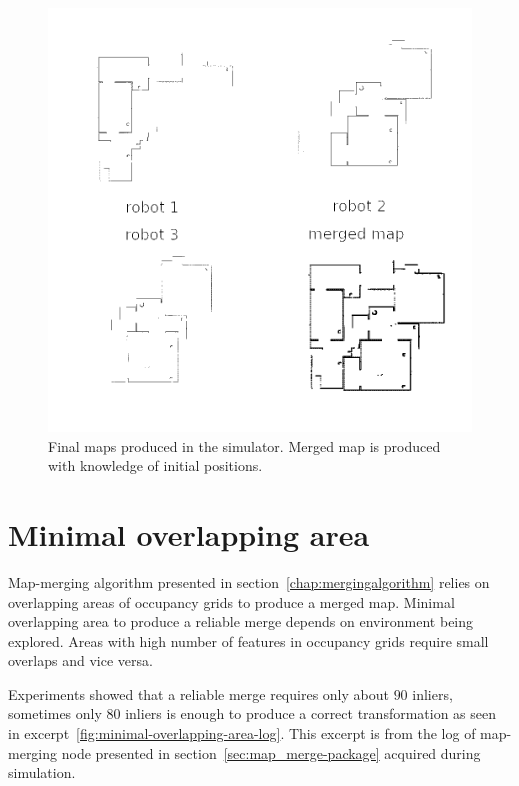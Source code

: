 \begin{figure}
    \centering
    \includegraphics[width=\textwidth]{../img/merging-with-known-initial-positions-end.png}
    \caption[Final maps produced in during experiment the simulator.]{Final maps produced in the simulator. Merged map is produced with knowledge of initial positions.}
    \label{fig:merging-with-known-initial-positions-end}
\end{figure}

\section{Minimal overlapping area}
\label{sec:minimal-overlaping-area}

Map-merging algorithm presented in section~\ref{chap:mergingalgorithm} relies on overlapping areas of occupancy grids to produce a merged map. Minimal overlapping area to produce a reliable merge depends on environment being explored. Areas with high number of features in occupancy grids require small overlaps and vice versa.

Experiments showed that a reliable merge requires only about $90$ inliers, sometimes only $80$ inliers is enough to produce a correct transformation as seen in excerpt~\ref{fig:minimal-overlapping-area-log}. This excerpt is from the log of map-merging node presented in section~\ref{sec:map_merge-package} acquired during simulation.

